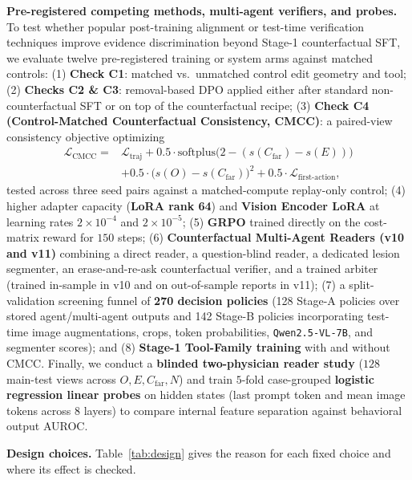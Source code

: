 \documentclass[journal]{IEEEtran}
\begin{document}
\textbf{Pre-registered competing methods, multi-agent verifiers, and probes.} To test whether popular post-training alignment or test-time verification techniques improve evidence discrimination beyond Stage-1 counterfactual SFT, we evaluate twelve pre-registered training or system arms against matched controls:
(1) \textbf{Check C1}: matched vs.\ unmatched control edit geometry and tool;
(2) \textbf{Checks C2 \& C3}: removal-based DPO \citep{rafailov2023dpo} applied either after standard non-counterfactual SFT or on top of the counterfactual recipe;
(3) \textbf{Check C4 (Control-Matched Counterfactual Consistency, CMCC)}: a paired-view consistency objective optimizing
\begin{equation}
\label{eq:cmcc}
\begin{split}
\mathcal{L}_{\text{CMCC}} = {}& \mathcal{L}_{\text{traj}} + 0.5 \cdot \text{softplus}\big(2 - (s(C_{\text{far}}) - s(E))\big)\\
&+ 0.5 \cdot \big(s(O) - s(C_{\text{far}})\big)^2 + 0.5 \cdot \mathcal{L}_{\text{first-action}},
\end{split}
\end{equation}
tested across three seed pairs against a matched-compute replay-only control;
(4) higher adapter capacity (\textbf{LoRA rank 64}) and \textbf{Vision Encoder LoRA} at learning rates $2\times 10^{-4}$ and $2\times 10^{-5}$;
(5) \textbf{GRPO} \citep{shao2024deepseekmath} trained directly on the cost-matrix reward for $150$ steps;
(6) \textbf{Counterfactual Multi-Agent Readers (v10 and v11)} combining a direct reader, a question-blind reader, a dedicated lesion segmenter, an erase-and-re-ask counterfactual verifier, and a trained arbiter (trained in-sample in v10 and on out-of-sample reports in v11);
(7) a split-validation screening funnel of \textbf{270 decision policies} (128 Stage-A policies over stored agent/multi-agent outputs and 142 Stage-B policies incorporating test-time image augmentations, crops, token probabilities, \texttt{Qwen2.5-VL-7B}, and segmenter scores); and
(8) \textbf{Stage-1 Tool-Family training} with and without CMCC.
Finally, we conduct a \textbf{blinded two-physician reader study} ($128$ main-test views across $O, E, C_{\text{far}}, N$) and train $5$-fold case-grouped \textbf{logistic regression linear probes} \citep{alain2016understanding} on hidden states (last prompt token and mean image tokens across $8$ layers) to compare internal feature separation against behavioral output AUROC.

\textbf{Design choices.} Table~\ref{tab:design} gives the reason for each fixed choice and where its effect is checked.
\end{document}
